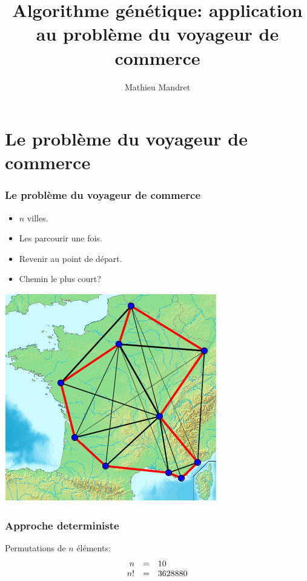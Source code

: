 \documentclass{beamer}
\title{Algorithme génétique: application au problème du voyageur de commerce}
\author{Mathieu Mandret}
\institute{IUT Paul Sabatier}
\begin{document}
\begin{frame}
  \maketitle
\end{frame}

\begin{frame}
  \tableofcontents
\end{frame}

\section{Le problème du voyageur de commerce}
\begin{frame}
  \frametitle{Le problème du voyageur de commerce}
  \begin{itemize}
    \item $n$ villes.
    \item Les parcourir une fois.
    \item Revenir au point de départ.
    \item Chemin le plus court?
  \end{itemize}
\end{frame}

\begin{frame}
  \begin{center}
    \includegraphics[scale=0.7]{Carte_france_10_villes.png}
  \end{center}
\end{frame}

\begin{frame}
  \frametitle{Approche deterministe}
  Permutations de $n$ éléments:
  \[
  \begin{array}{r c l}
  n &=& 10 \\
  n! &=& 3 628 880
  \end{array}
  \]
\end{frame}
\end{document}
